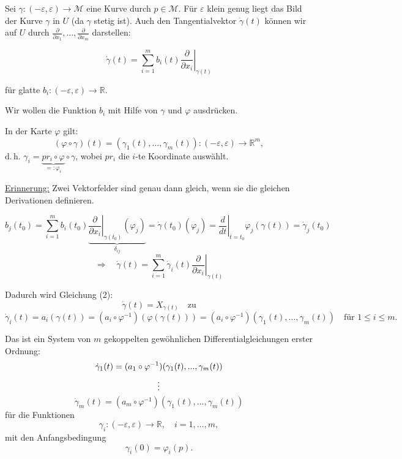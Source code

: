 \documentclass[fleqn, 12pt, letterpaper]{article}
\begin{document}
Sei \(\gamma: (-\varepsilon, \varepsilon) \to \mathcal{M}\) eine Kurve durch \(p \in \mathcal{M}\).  
Für \(\varepsilon\) klein genug liegt das Bild der Kurve \(\gamma\) in \(U\) (da \(\gamma\) stetig ist).  
Auch den Tangentialvektor \(\dot{\gamma}(t)\) können wir auf \(U\) durch \(\frac{\partial}{\partial x_1}, \dotsc, \frac{\partial}{\partial x_m}\) darstellen:

\[
\dot{\gamma}(t) = \sum_{i=1}^m b_i(t) \left. \frac{\partial}{\partial x_i} \right|_{\gamma(t)}
\]

für glatte \(b_i: (-\varepsilon, \varepsilon) \to \mathbb{R}\).

\vspace{0.3cm}

Wir wollen die Funktion $b_i$ mit Hilfe von \(\gamma\) und \(\varphi\) ausdrücken.

In der Karte \(\varphi\) gilt:
\[
(\varphi \circ \gamma)(t) = (\gamma_1(t), \dotsc, \gamma_m(t)) : (-\varepsilon, \varepsilon) \to \mathbb{R}^m,
\]
d.\,h. \(\gamma_i = \underbrace{pr_i \circ \varphi}_{=:\varphi_i} \circ \gamma\), wobei \(pr_i\) die \(i\)-te Koordinate auswählt.

{\underline{Erinnerung:}} Zwei Vektorfelder sind genau dann gleich, wenn sie die gleichen Derivationen definieren.

\[b_j(t_0) = \sum_{i=1}^m b_i(t_0) \underbrace{\left. \frac{\partial}{\partial x_i} \right|_{\gamma(t_0)} (\varphi_j)}_{\delta_{ij}}
= \dot{\gamma}(t_0)(\varphi_j) = \left. \frac{d}{dt} \right|_{t=t_0} \varphi_j(\gamma(t))
= \dot{\gamma}_j(t_0)
\]
\[
\Rightarrow \quad \dot{\gamma}(t) = \sum_{i=1}^m \dot{\gamma}_i(t) \left. \frac{\partial}{\partial x_i} \right|_{\gamma(t)}
\]

Dadurch wird Gleichung (2): 
\[
\dot{\gamma}(t) = X_{\gamma(t)} \quad \text{zu}
\]
\[
\dot{\gamma}_i(t) = a_i(\gamma(t)) = (a_i \circ \varphi^{-1})(\varphi(\gamma(t)))
= (a_i \circ \varphi^{-1})(\gamma_1(t), \ldots, \gamma_m(t))
\quad \text{für } 1 \leq i \leq m.
\]

Das ist ein System von \(m\) gekoppelten gewöhnlichen Differentialgleichungen erster Ordnung:
\[
\dot{\gamma}_1(t) = (a_1\circ\varphi^{-1})(\gamma_1(t),...,\gamma_m(t)) \\ 
\]
\[
\vdots \\
\]
\[
\dot{\gamma}_m(t) = (a_m\circ\varphi^{-1})(\gamma_1(t),...,\gamma_m(t))
\]
für die Funktionen
\[
\gamma_i: (-\varepsilon, \varepsilon) \to \mathbb{R}, \quad i = 1, \dotsc, m,
\]
mit den Anfangsbedingung
\[
\gamma_i(0) = \varphi_i(p).
\]
\end{document}

